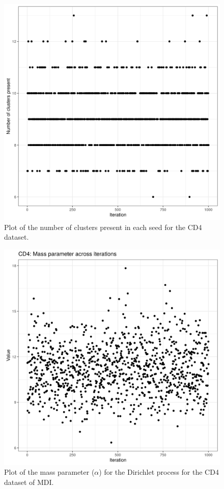 \documentclass[12pt]{article} %
\begin{document}
	\newpage


	\begin{figure}[h]
		\centering
		\includegraphics[scale=0.75]{Images/Biology_data/Set_250/All_datasets/Cluster_series_plots/CD4.png}
		\caption{Plot of the number of clusters present in each seed for the CD4 dataset.}
		\label{fig:results:cedar_1:mdi_cd4_number_clusters_plot}
	\end{figure}
	
	\newpage
	
	\begin{figure}[h]
		\centering
		\includegraphics[scale=0.75]{Images/Biology_data/Set_250/All_datasets/Mass_parameter_plots/CD4.png}
		\caption{Plot of the mass parameter ($\alpha$) for the Dirichlet process for the CD4 dataset of MDI.}
		\label{fig:results:cedar_1:mdi_cd4_mass_parameter_plot}
	\end{figure}
	
\end{document}
